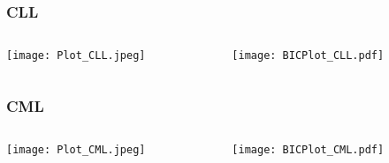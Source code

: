 \documentclass[10pt,dvipsnames,table]{beamer}
\begin{document}
\begin{frame}
\frametitle{CLL}
\begin{columns}
\begin{column}{5cm}
\texttt{[image: Plot\_CLL.jpeg]} \\
\end{column}
\begin{column}{5cm}
\pause \texttt{[image: BICPlot\_CLL.pdf]} \\
\end{column}
\end{columns}
\end{frame}

\begin{frame}
\frametitle{CML}
\begin{columns}
\begin{column}{5cm}
\texttt{[image: Plot\_CML.jpeg]} \\
\end{column}
\begin{column}{5cm}
\pause \texttt{[image: BICPlot\_CML.pdf]} \\
\end{column}
\end{columns}
\end{frame}
\end{document}

